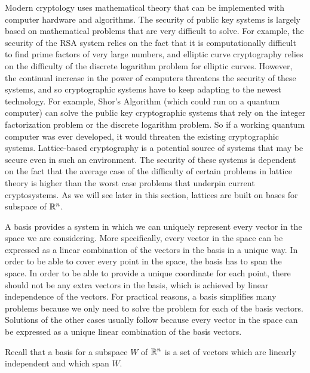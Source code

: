 Modern cryptology uses mathematical theory that can be implemented with computer hardware and algorithms. The security of public key systems is largely based on mathematical problems that are very difficult to solve. For example, the security of the RSA system relies on the fact that it is computationally difficult to find prime factors of very large numbers, and elliptic curve cryptography relies on the difficulty of the discrete logarithm problem for elliptic curves.  However, the continual increase in the power of computers threatens the security of these systems, and so cryptographic systems have to keep adapting to the newest technology. For example, Shor's Algorithm (which could run on a quantum computer) can solve the public key cryptographic systems that rely on the integer factorization problem or the discrete logarithm problem. So if a working quantum computer was ever developed, it would threaten the existing cryptographic systems. Lattice-based cryptography is a potential source of systems that may be secure even in such an environment. The security of these systems is dependent on the fact that the average case of the difficulty of certain problems in lattice theory is higher than the worst case problems that underpin current cryptosystems.  As we will see later in this section, lattices are built on bases for subspace of $\mathbb{R}^n$.

\label{sec:base_dim_intro}
A basis provides a system in which we can uniquely represent every vector in the space we are considering. More specifically, every vector in the space can be expressed as a linear combination of the vectors in the basis in a unique way. In order to be able to cover every point in the space, the basis has to span the space. In order to be able to provide a unique coordinate for each point, there should not be any extra vectors in the basis, which is achieved by linear independence of the vectors. For practical reasons, a basis simplifies many problems because we only need to solve the problem for each of the basis vectors. Solutions of the other cases usually follow because every vector in the space can be expressed as a unique linear combination of the basis vectors.

Recall that a basis for a subspace $W$ of $\mathbb{R}^n$ is a set of vectors which are linearly independent and which span $W$. 

